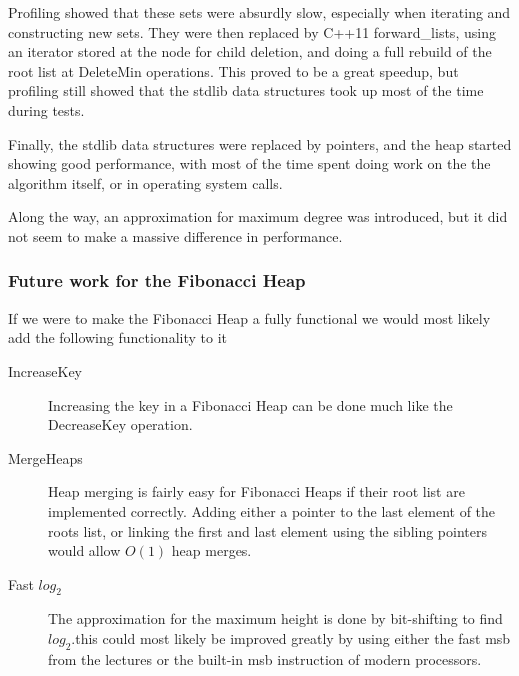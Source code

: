 Profiling showed that these sets were absurdly slow, especially when iterating and constructing new sets. They were then replaced by C++11 forward\_lists, using an iterator stored at the node for child deletion, and doing a full rebuild of the root list at DeleteMin operations. This proved to be a great speedup, but profiling still showed that the stdlib data structures took up most of the time during tests.

Finally, the stdlib data structures were replaced by pointers, and the heap started showing good performance, with most of the time spent doing work on the the algorithm itself, or in operating system calls.

Along the way, an approximation for maximum degree was introduced, but it did not seem to make a massive difference in performance.

\subsubsection{Future work for the Fibonacci Heap}

If we were to make the Fibonacci Heap a fully functional we would most likely add the following functionality to it

\begin{description}
\item[IncreaseKey] Increasing the key in a Fibonacci Heap can be done much like the DecreaseKey operation.
\item[MergeHeaps] Heap merging is fairly easy for Fibonacci Heaps if their root list are implemented correctly. Adding either a pointer to the last element of the roots list, or linking the first and last element using the sibling pointers would allow $O(1)$ heap merges.
\item[Fast $log_2$] The approximation for the maximum height is done by bit-shifting to find $log_2$.this could most likely be improved greatly by using either the fast msb from the lectures or the built-in msb instruction of modern processors.
\end{description}